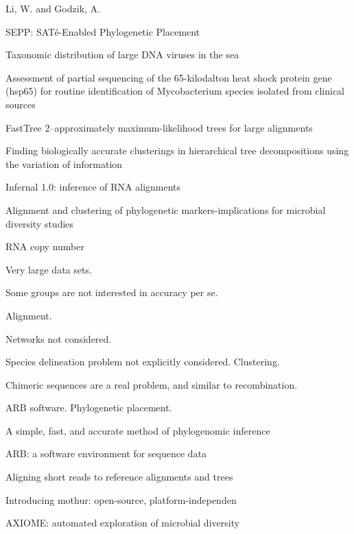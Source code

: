 \documentclass{amsart}
\begin{document}
\cite{li2006cdhit}
Li, W.  and Godzik, A.
\cite{edgar2010usearch}

\cite{mirarabsepp}
{SEPP: SAT{\'e}-Enabled Phylogenetic Placement}

\cite{monierEaLargeViruses08}
{Taxonomic distribution of large DNA viruses in the sea}


\cite{huson2007megan}

\cite{mcnabb2004hsp65}
{{A}ssessment of partial sequencing of the 65-kilodalton heat shock protein gene (hsp65) for routine identification of {M}ycobacterium species isolated from clinical sources}

\cite{price2010fasttree}
{FastTree 2--approximately maximum-likelihood trees for large alignments}

\cite{navlakha2009finding}
Finding biologically accurate clusterings in hierarchical tree decompositions using the variation of information

\cite{nawrocki2009infernal}
Infernal 1.0: inference of RNA alignments

\cite{white2010alignment}
Alignment and clustering of phylogenetic markers-implications for microbial diversity studies


RNA copy number
\cite{morganEaInVitroSimulatedMetagenome10}


Very large data sets.

Some groups are not interested in accuracy per se.

Alignment.

Networks not considered.

Species delineation problem not explicitly considered. Clustering.

Chimeric sequences are a real problem, and similar to recombination.

ARB software.
Phylogenetic placement.

\cite{wu2008simple}
A simple, fast, and accurate method of phylogenomic inference

\cite{matsen2010pplacer}

\cite{ludwig2004arb}
{{ARB}: a software environment for sequence data}
\cite{berger2011performance}

\cite{berger2011aligning}
Aligning short reads to reference alignments and trees

\cite{caporaso2010qiime}

\cite{schloss2009introducing}
Introducing mothur: open-source, platform-independen

\cite{lynch2013axiome}
AXIOME: automated exploration of microbial diversity
\end{document}
